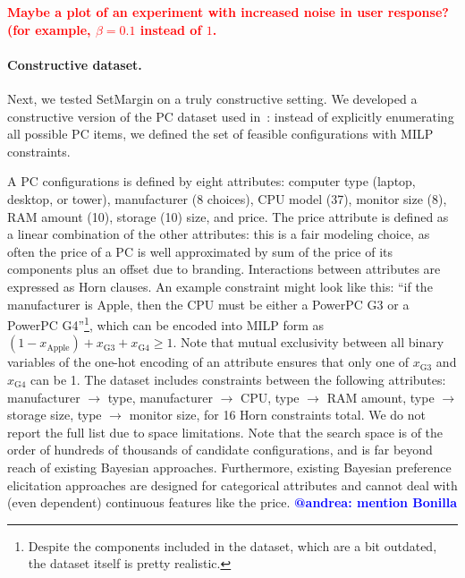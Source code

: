 \documentclass{article}
\renewcommand\[{\begin{equation}}
\renewcommand\]{\end{equation}}
\newcommand{\andrea}[1]{{\bf \textcolor{blue}{{\fbox{Andrea:} #1}}}}
\newcommand{\paolo}[1]{{\bf \textcolor{red}{{\fbox{Paolo:} #1}}}}
\begin{document}
\paolo{Maybe a plot of an experiment with increased noise in user response? (for example, $\beta=0.1$ instead of $1$.}


\paragraph{Constructive dataset.} Next, we tested {\sc SetMargin} on a truly
constructive setting. We developed a constructive version of the PC dataset
used in~\cite{guo2010real}: instead of explicitly enumerating all possible PC
items, we defined the set of feasible configurations with MILP constraints.

A PC configurations is defined by eight attributes: computer type (laptop,
desktop, or tower), manufacturer (8 choices), CPU model (37), monitor size (8), RAM amount (10), storage (10)
size, and price.
The price attribute is defined as a linear combination of the other
attributes: this is a fair modeling choice, as often the price of a PC is
well approximated by sum of the price of its components plus an offset due to
branding.
%
Interactions between attributes are expressed as Horn clauses. An example
constraint might look like this: ``if the manufacturer is Apple, then the
CPU must be either a PowerPC G3 or a PowerPC G4''\footnote{Despite the components
included in the dataset, which are a bit outdated, the dataset itself is pretty
realistic.}, which can be encoded
into MILP form as
%
$ (1 - x_\text{Apple}) + x_\text{G3} + x_\text{G4} \ge 1 $.
%
Note that mutual exclusivity between all binary variables of the
one-hot encoding of an attribute ensures that only one of
$x_\text{G3}$ and $x_\text{G4}$ can be 1.  The dataset includes
constraints between the following attributes: manufacturer $\to$ type,
manufacturer $\to$ CPU, type $\to$ RAM amount, type $\to$ storage
size, type $\to$ monitor size, for 16 Horn constraints total. We do
not report the full list due to space limitations. Note that the
search space is of the order of hundreds of thousands of candidate
configurations, and is far beyond reach of existing Bayesian
approaches. Furthermore, existing Bayesian preference elicitation
approaches are designed for categorical attributes and cannot deal
with (even dependent) continuous features like the price. \andrea{@andrea: mention Bonilla}
\end{document}
